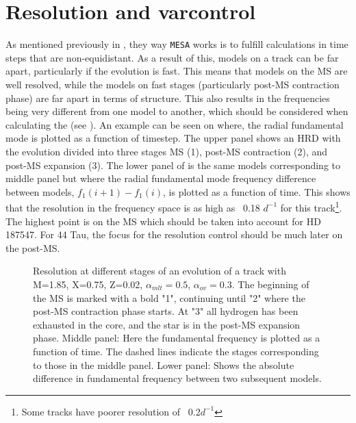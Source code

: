 \section{Resolution and varcontrol}
\label{sec:res}

As mentioned previously in , they way \texttt{MESA} works is to fulfill calculations in time steps that are non-equidistant. As a result of this, models on a track can be far apart, particularly if the evolution is fast. This means that models on the MS are well resolved, while the models on fast stages (particularly post-MS contraction phase) are far apart in terms of structure. This also results in the frequencies being very different from one model to another, which should be considered when calculating the \chis (see ). An example can be seen on  where, the radial fundamental mode is plotted as a function of timestep. The upper panel shows an HRD with the evolution divided into three stages MS (1), post-MS contraction (2), and post-MS expansion (3). The lower panel of  is the same models corresponding to middle panel but where the radial fundamental mode frequency difference between models, $f_1(i+1) - f_1(i)$, is plotted as a function of time. This shows that the resolution in the frequency space is as high as ~0.18 $d^{-1}$ for this track\footnote{Some tracks have poorer resolution of ~0.2$d^{-1}$}. The highest point is on the MS which should be taken into account for HD 187547. For 44 Tau, the focus for the resolution control should be much later on the post-MS.      

\begin{figure}[htbp]
    \centering
    \caption{Resolution at different stages of an evolution of a track with M=1.85\msun, X=0.75, Z=0.02, $\alpha_{mlt} = 0.5$, $\alpha_{ov} = 0.3$. The beginning of the MS is marked with a bold "1", continuing until "2" where the post-MS contraction phase starts. At "3" all hydrogen has been exhausted in the core, and the star is in the post-MS expansion phase. Middle panel: Here the fundamental frequency is plotted as a function of time. The dashed lines indicate the stages corresponding to those in the middle panel. Lower panel: Shows the absolute difference in fundamental frequency between two subsequent models.}
    \label{resstage}
\end{figure}

